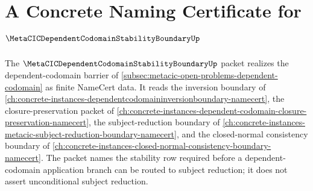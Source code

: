 \chapter{A Concrete Naming Certificate for $\MetaCICDependentCodomainStabilityBoundaryUp$}
\label{ch:concrete-instances-metacic-dependent-codomain-stability-boundary-namecert}

The $\MetaCICDependentCodomainStabilityBoundaryUp$ packet realizes the dependent-codomain barrier of \autoref{subsec:metacic-open-problems-dependent-codomain} as finite NameCert data. It reads the inversion boundary of \autoref{ch:concrete-instances-dependentcodomaininversionboundary-namecert}, the closure-preservation packet of \autoref{ch:concrete-instances-dependent-codomain-closure-preservation-namecert}, the subject-reduction boundary of \autoref{ch:concrete-instances-metacic-subject-reduction-boundary-namecert}, and the closed-normal consistency boundary of \autoref{ch:concrete-instances-closed-normal-consistency-boundary-namecert}. The packet names the stability row required before a dependent-codomain application branch can be routed to subject reduction; it does not assert unconditional subject reduction.

